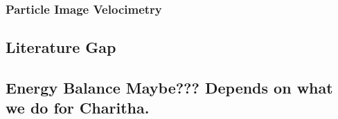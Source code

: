 \subsubsection{Particle Image Velocimetry}

\pagebreak
\subsection{Literature Gap}
\subsection{Energy Balance Maybe??? Depends on what we do for Charitha.}

\pagebreak



